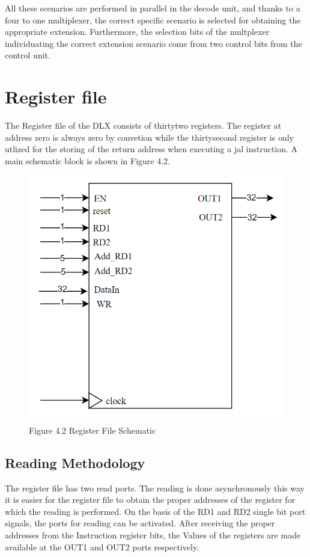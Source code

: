     All these scenarios are performed in parallel in the decode unit, and thanks to a four to one multiplexer, the correct specific scenario is selected for obtaining
    the appropriate extension. Furthermore, the selection bits of the multplexer individuating the correct extension scenario come from two control bits from the control unit.

\section {Register file}

    The Register file of the DLX consists of thirtytwo registers. The register at address zero is always zero by convetion while the thirtysecond
    register is only utlized for the storing of the return address when executing a jal instruction. A main schematic block is shown in Figure 4.2.

\begin{figure}[h!]
    \centering
    \includegraphics[scale = 0.45]
    {chapters/figures/RegisterFile}
    \caption{Figure 4.2 Register File Schematic }
    \label{fig:RFpic}
    \end{figure}

        \subsection{Reading Methodology}
        The register file has two read ports. The reading is done asynchronously this way it is easier for the register file to obtain the proper
        addresses of the register for which the reading is performed. On the basis of the RD1 and RD2 single bit port signals, the ports for reading can be activated.
        After receiving the proper addresses from the Instruction register bits, the Values of the registers are made available at the OUT1 and OUT2 ports respectively.

